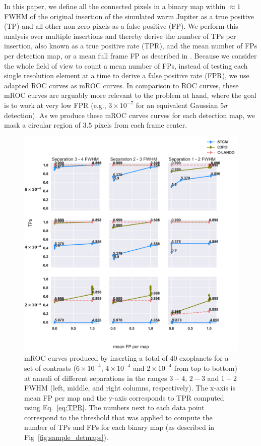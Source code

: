 \documentclass{aa}
\begin{document}
In this paper, we define all the connected pixels in a binary map within $\approx 1$ FWHM of the original insertion of the simulated warm Jupiter as a true positive (TP) and all other non-zero pixels as a false positive (FP). We perform this analysis over multiple insertions and thereby derive the number of TPs per insertion, also known as a true positive rate (TPR), and the mean number of FPs per detection map, or a mean full frame FP as described in \citet{2018Gomez}. Because we consider the whole field of view to count a mean number of FPs, instead of testing each single resolution element at a time to derive a false positive rate (FPR), we use adapted ROC curves as mROC curves. In comparison to ROC curves, these mROC curves are arguably more relevant to the problem at hand, where the goal is to work at very low FPR (e.g., $3\times 10^{-7}$ for an equivalent Gaussian $5\sigma$ detection). As we produce these mROC curves  curves for each detection map, we mask a circular region of $3.5$ pixels from each frame center.

\begin{figure}
\centering
    \includegraphics[width=1.0\textwidth]{fig4_dec2023.png}
\caption{ mROC curves produced by inserting a total of 40 exoplanets for a set of contrasts ($6 \times 10^{-4}$, $4 \times 10^{-4}$ and $2 \times 10^{-4}$ from top to bottom) at annuli of different separations in the ranges $3-4$, $2-3$ and $1-2$ FWHM (left, middle, and right columns, respectively).
The x-axis is mean FP per map and the y-axis corresponds to TPR computed using Eq.~\ref{eq:TPR}. 
The numbers next to each data point correspond to the threshold that was applied to compute the number of TPs and FPs for each binary map (as described in Fig~\ref{fig:sample_detmaps}).
}
    \label{fig:fig_4}
\end{figure}
\end{document}
